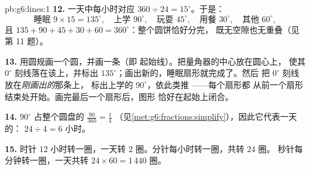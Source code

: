 \begin{solution}{pb:g6:lines:1}
\textbf{12.} 一天中每小时对应
$360 \div 24 = 15^\circ$。于是：
\[
\text{睡眠 } 9 \times 15 = 135^\circ, \quad
\text{上学 } 90^\circ, \quad
\text{玩耍 } 45^\circ, \quad
\text{用餐 } 30^\circ, \quad
\text{其他 } 60^\circ,
\]
且 $135 + 90 + 45 + 30 + 60 = 360^\circ$：整个圆饼恰好分完，
既无空隙也无重叠（见第 11 题）。

\textbf{13.} 用圆规画一个圆，并画一条（即
起始线）。把量角器的中心放在圆心上，
使其 $0^\circ$ 刻线落在该上，并标出
$135^\circ$；画出新的，睡眠扇形就完成了。然后
把 $0^\circ$ 刻线放在\emph{刚画出的}那条上，
标出上学的 $90^\circ$，依此类推 ——每个扇形都
从前一个扇形结束处开始。画完最后一个扇形后，图形
恰好在起始上闭合。

\textbf{14.} $90^\circ$ 占整个圆盘的 $\frac{90}{360} = \frac14$
（见\cref{met:g6:fractions:simplify}），因此它代表一天的：
$24 \div 4 = 6$ 小时。

\textbf{15.} 时针 $12$ 小时转一圈，一天转 $2$
圈。分针每小时转一圈，共转 $24$ 圈。
秒针每分钟转一圈，一天共转 $24 \times 60 = 1\,440$
圈。
\end{solution}
